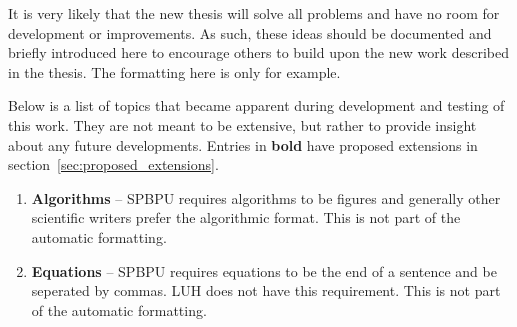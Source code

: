 \label{sec:topic_points}
It is very likely that the new thesis will solve all problems and have no room for development or improvements. As such, these ideas should be documented and briefly introduced here to encourage others to build upon the new work described in the thesis. The formatting here is only for example.

Below is a list of topics that became apparent during development and testing of this work. They are not meant to be extensive, but rather to provide insight about any future developments. Entries in \textbf{bold} have proposed extensions in section~\ref{sec:proposed_extensions}.

\begin{enumerate}
    \item \textbf{Algorithms} – SPBPU requires algorithms to be figures and generally other scientific writers prefer the algorithmic format. This is not part of the automatic formatting.
    \item \textbf{Equations} – SPBPU requires equations to be the end of a sentence and be seperated by commas. LUH does not have this requirement. This is not part of the automatic formatting.
\end{enumerate}

